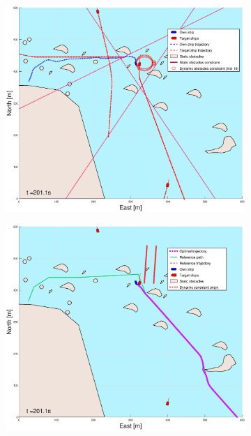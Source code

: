 \begin{figure}[ht]
\begin{subfigure}[b]{0.499\textwidth}
    \end{subfigure}
    \hfill
    \\
    \begin{subfigure}[b]{0.49\textwidth}
        \centering
        \includegraphics[width=\textwidth]{Images/Figures/skjergard_m_trafikk_NEW/_Simple_1fig1_time=201}
    \end{subfigure}
    \hfill
    \begin{subfigure}[b]{0.499\textwidth}
        \centering
        \includegraphics[width=\textwidth]{Images/Figures/skjergard_m_trafikk_NEW/_Simple_1fig999_time=201}

\end{subfigure}
\end{figure}

